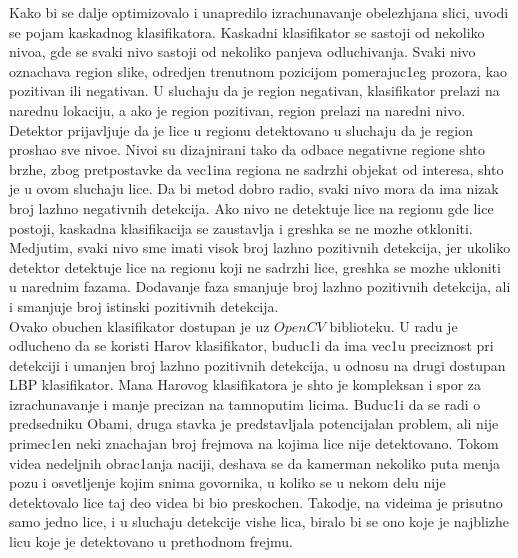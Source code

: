\documentclass[a4paper, openany, oneside, 11pt]{book}
\begin{document}
Kako bi se dalje optimizovalo i unapredilo izrachunavanje obelezhjana slici, uvodi se pojam kaskadnog klasifikatora. Kaskadni klasifikator se sastoji od nekoliko nivoa, gde se svaki nivo sastoji od nekoliko panjeva odluchivanja. Svaki nivo oznachava region slike, odredjen trenutnom pozicijom pomerajuc1eg prozora, kao pozitivan ili negativan. U sluchaju da je region negativan, klasifikator prelazi na narednu lokaciju, a ako je region pozitivan, region prelazi na naredni nivo. Detektor prijavljuje da je lice u regionu detektovano u sluchaju da je region proshao sve nivoe. Nivoi su dizajnirani tako da odbace negativne regione shto brzhe, zbog pretpostavke da vec1ina regiona ne sadrzhi objekat od interesa, shto je u ovom sluchaju lice. Da bi metod dobro radio, svaki nivo mora da ima nizak broj lazhno negativnih detekcija. Ako nivo ne detektuje lice na regionu gde lice postoji, kaskadna klasifikacija se zaustavlja i greshka se ne mozhe otkloniti. Medjutim, svaki nivo sme imati visok broj lazhno pozitivnih detekcija, jer ukoliko detektor detektuje lice na regionu koji ne sadrzhi lice, greshka se mozhe ukloniti u narednim fazama. Dodavanje faza smanjuje broj lazhno pozitivnih detekcija, ali i smanjuje broj istinski pozitivnih detekcija.\\
Ovako obuchen klasifikator dostupan je uz $OpenCV$ biblioteku. U radu je odlucheno da se koristi Harov klasifikator, buduc1i da ima vec1u preciznost pri detekciji i umanjen broj lazhno pozitivnih detekcija, u odnosu na drugi dostupan \acrshort{LBP} klasifikator. Mana Harovog klasifikatora je shto je kompleksan i spor za izrachunavanje i manje precizan na tamnoputim licima. Buduc1i da se radi o predsedniku Obami, druga stavka je predstavljala potencijalan problem, ali nije primec1en neki znachajan broj frejmova na kojima lice nije detektovano. Tokom videa nedeljnih obrac1anja naciji, deshava se da kamerman nekoliko puta menja pozu i osvetljenje kojim snima govornika, u koliko se u nekom delu nije detektovalo lice taj deo videa bi bio preskochen. Takodje, na videima je prisutno samo jedno lice, i u sluchaju detekcije vishe lica, biralo bi se ono koje je najblizhe licu koje je detektovano u prethodnom frejmu.
\end{document}
